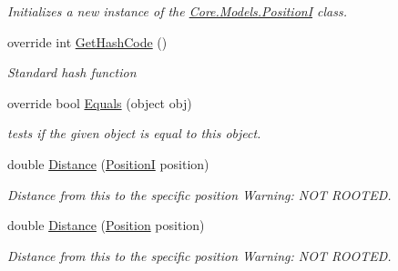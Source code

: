 \begin{DoxyCompactItemize}
\begin{DoxyCompactList}\small\item\em Initializes a new instance of the \hyperlink{classCore_1_1Models_1_1PositionI}{Core.\+Models.\+Position\+I} class. \end{DoxyCompactList}\item 
override int \hyperlink{classCore_1_1Models_1_1PositionI_a082277a73568d67195014709867621c4}{Get\+Hash\+Code} ()
\begin{DoxyCompactList}\small\item\em Standard hash function \end{DoxyCompactList}\item 
override bool \hyperlink{classCore_1_1Models_1_1PositionI_a369069ed29555fd908a4a94df50d0543}{Equals} (object obj)
\begin{DoxyCompactList}\small\item\em tests if the given object is equal to this object. \end{DoxyCompactList}\item 
double \hyperlink{classCore_1_1Models_1_1PositionI_ae0f397e10a3daa4cbe2b2103018bb3b0}{Distance} (\hyperlink{classCore_1_1Models_1_1PositionI}{Position\+I} position)
\begin{DoxyCompactList}\small\item\em Distance from this to the specific position Warning\+: N\+O\+T R\+O\+O\+T\+E\+D. \end{DoxyCompactList}\item 
double \hyperlink{classCore_1_1Models_1_1PositionI_af02949d6124b593a75f9dcb947d89dce}{Distance} (\hyperlink{classCore_1_1Models_1_1Position}{Position} position)
\begin{DoxyCompactList}\small\item\em Distance from this to the specific position Warning\+: N\+O\+T R\+O\+O\+T\+E\+D. \end{DoxyCompactList}\end{DoxyCompactItemize}
